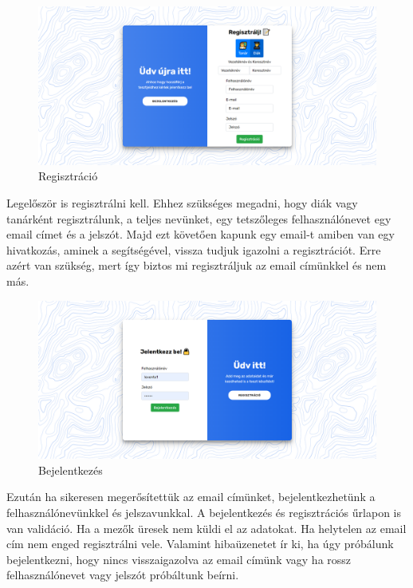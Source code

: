 \begin{figure}[H]
    \centering
    \includegraphics[width=\linewidth]{images/signin.png}
    \caption{Regisztráció}
    \label{fig:signin}
\end{figure}


Legelőször is regisztrálni  kell. Ehhez szükséges megadni, hogy diák vagy tanárként regisztrálunk, a teljes nevünket, egy tetszőleges felhasználónevet egy email címet és a jelszót. Majd ezt követően kapunk egy email-t amiben van egy hivatkozás, aminek a segítségével, vissza tudjuk igazolni a regisztrációt. Erre azért van szükség, mert így biztos mi regisztráljuk az email címünkkel és nem más.

\begin{figure}[H]
    \centering
    \includegraphics[width=\linewidth]{images/login.png}
    \caption{Bejelentkezés}
    \label{fig:login}
\end{figure}

Ezután ha sikeresen megerősítettük az email címünket, bejelentkezhetünk  a felhasználónevünkkel és jelszavunkkal.
A bejelentkezés és regisztrációs űrlapon is van validáció. Ha a mezők üresek nem küldi el az adatokat. Ha helytelen az email cím nem enged regisztrálni vele. Valamint hibaüzenetet ír ki, ha úgy próbálunk bejelentkezni, hogy nincs visszaigazolva az email címünk vagy ha rossz felhasználónevet vagy jelszót próbáltunk beírni.

